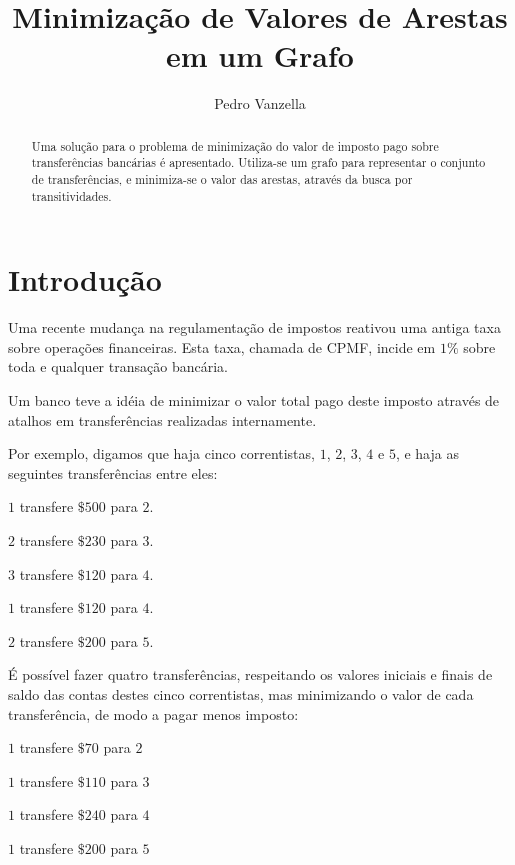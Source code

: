 \documentclass[12pt]{article}
\title{Minimização de Valores de Arestas em um Grafo}
\author{Pedro Vanzella}
\begin{document}
\maketitle

\begin{abstract}
  Uma solução para o problema de minimização do valor de imposto pago sobre
  transferências bancárias é apresentado. Utiliza-se um grafo para representar o
  conjunto de transferências, e minimiza-se o valor das arestas, através da
  busca por transitividades.
\end{abstract}

\section{Introdução}\label{sec:intro}

Uma recente mudança na regulamentação de impostos reativou uma antiga taxa sobre
operações financeiras. Esta taxa, chamada de CPMF, incide em $1\%$ sobre toda e
qualquer transação bancária.

Um banco teve a idéia de minimizar o valor total pago deste imposto através de
atalhos em transferências realizadas internamente.

Por exemplo, digamos que haja cinco correntistas, $1$, $2$, $3$, $4$
 e $5$, e haja as seguintes transferências entre eles:
\begin{list}{}{}
  \item $1$ transfere $\$500$ para $2$.
  \item $2$ transfere $\$230$ para $3$.
  \item $3$ transfere $\$120$ para $4$.
  \item $1$ transfere $\$120$ para $4$.
  \item $2$ transfere $\$200$ para $5$.
\end{list}


É possível fazer quatro transferências, respeitando os valores iniciais e finais
de saldo das contas destes cinco correntistas, mas minimizando o valor de cada
transferência, de modo a pagar menos imposto:

\begin{list}{}{}
  \item $1$ transfere $\$70$ para $2$
  \item $1$ transfere $\$110$ para $3$
  \item $1$ transfere $\$240$ para $4$
  \item $1$ transfere $\$200$ para $5$
\end{list}
\end{document}
